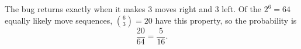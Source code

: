 The bug returns exactly when it makes $3$ moves right and $3$ left. Of the $2^6=64$ equally likely move sequences, $\binom63=20$ have this property, so the probability is
\[
\dfrac{20}{64}=\boxed{\dfrac{5}{16}} .
\]
